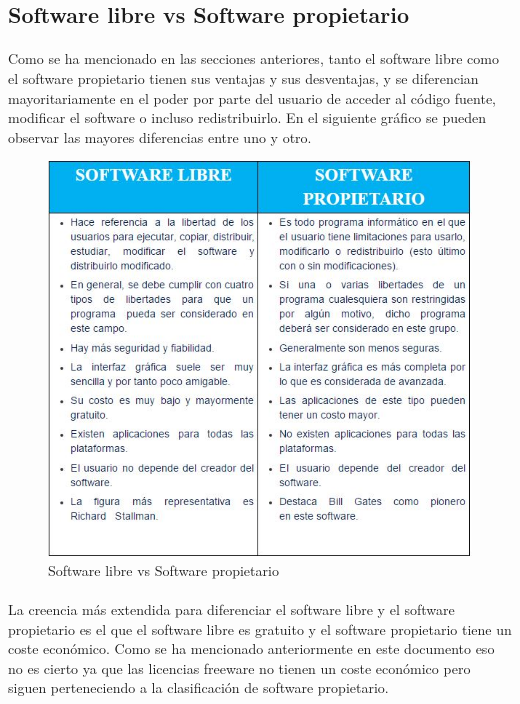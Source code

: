 \documentclass[10pt]{article}
\begin{document}
        \subsection{Software libre vs Software propietario}
        \paragraph{}
        Como se ha mencionado en las secciones anteriores, tanto el software libre como el software propietario tienen sus ventajas y sus desventajas, y se diferencian mayoritariamente en el poder por parte del usuario de acceder al código fuente, modificar el software o incluso redistribuirlo. En el siguiente gráfico se pueden observar las mayores diferencias entre uno y otro.
        
        \begin{figure}[htb]
            \centering
            \includegraphics[width=0.6 \textwidth]{Captura-PyS.JPG}
            \caption{Software libre vs Software propietario}\label{vs}
        \end{figure}
        
        
        \paragraph{}
        La creencia más extendida para diferenciar el software libre y el software propietario es el que el software libre es gratuito y el software propietario tiene un coste económico. Como se ha mencionado anteriormente en este documento eso no es cierto ya que las licencias freeware no tienen un coste económico pero siguen perteneciendo a la clasificación de software propietario.
        
\end{document}
